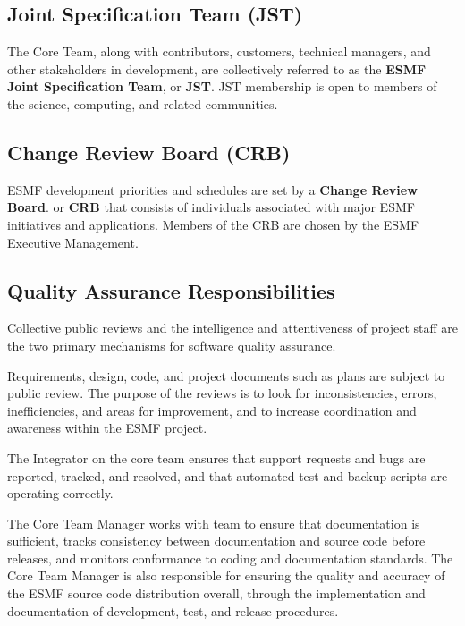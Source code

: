 \subsection{Joint Specification Team (JST)}
The Core Team, along with contributors, customers, technical
managers, and other stakeholders in development, are collectively
referred to as the {\bf ESMF Joint Specification Team}, or {\bf JST}.  
JST membership is open to members of the science, computing, and
related communities.

\subsection{Change Review Board (CRB)}
ESMF development priorities and schedules are set by a 
{\bf Change Review Board}. or {\bf CRB} that consists of individuals
associated with major ESMF initiatives and applications.  
Members of the CRB are chosen by the ESMF Executive Management.

\subsection{Quality Assurance Responsibilities}

Collective public reviews and the intelligence and attentiveness of
project staff are the two primary mechanisms for software quality assurance.  

Requirements, design, code, and project documents such as plans
are subject to public review.  The purpose of the reviews is
to look for inconsistencies, errors, inefficiencies, and areas
for improvement, and to increase coordination and awareness within
the ESMF project.

The Integrator on the core team ensures that support requests
and bugs are reported, tracked, and resolved, and that automated
test and backup scripts are operating correctly.

The Core Team Manager works with team to ensure that documentation
is sufficient, tracks consistency between documentation and source
code before releases, and monitors conformance to coding and
documentation standards.  The Core Team Manager is also responsible
for ensuring the quality and accuracy of the ESMF source code
distribution overall, through the implementation and documentation of
development, test, and release procedures.










